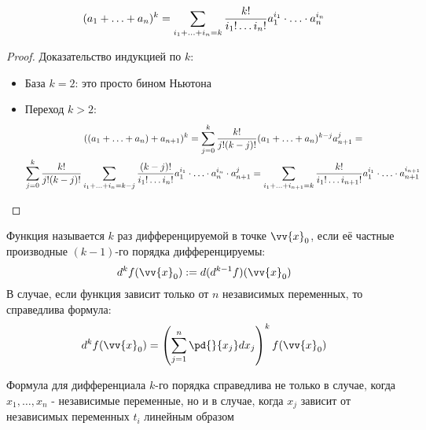 \begin{lemma}
	\[
		(a_1 + \ldots + a_n)^k = \sum\limits_{i_1 + \ldots + i_n = k} \frac{k!}{i_1! \ldots i_n!} a_1^{i_1} \cdot \ldots \cdot a_n^{i_n}
	\]
\end{lemma}

\begin{proof}
	Доказательство индукцией по $k$:
	\begin{itemize}
		\item База $k = 2$: это просто бином Ньютона
		
		\item Переход $k > 2$:
		\begin{multline*}
			((a_1 + \ldots + a_n) + a_{n + 1})^k = \sum\limits_{j = 0}^k \frac{k!}{j! (k - j)!} (a_1 + \ldots + a_n)^{k - j} a_{n + 1}^j =
			\\
			\sum\limits_{j = 0}^k \frac{k!}{j! (k - j)!} \sum\limits_{i_1 + \ldots + i_n = k - j} \frac{(k - j)!}{i_1! \ldots i_n!} a_1^{i_1} \cdot \ldots \cdot a_n^{i_n} \cdot a_{n + 1}^j = \sum\limits_{i_1 + \ldots + i_{n + 1} = k} \frac{k!}{i_1! \ldots i_{n + 1}!} a_1^{i_1} \cdot \ldots \cdot a_{n + 1}^{i_{n + 1}}
		\end{multline*}
	\end{itemize}
\end{proof}

\begin{definition}
	Функция называется $k$ раз дифференцируемой в точке $\vv{x}_0$, если её частные производные $(k - 1)$-го порядка дифференцируемы:
	\[
		d^k f(\vv{x}_0) := d(d^{k - 1} f)(\vv{x}_0)
	\]
	В случае, если функция зависит только от $n$ независимых переменных, то справедлива формула:
	\[
		d^k f(\vv{x}_0) = \left(\suml_{j = 1}^n \pd{}{x_j} dx_j\right)^k f(\vv{x}_0)
	\]
\end{definition}

\begin{note}
	Формула для дифференциала $k$-го порядка справедлива не только в случае, когда $x_1, \ldots, x_n$ - независимые переменные, но и в случае, когда $x_j$ зависит от независимых переменных $t_i$ линейным образом
\end{note}
